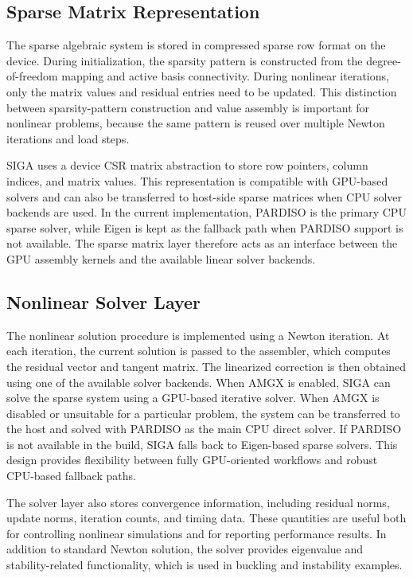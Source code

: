 \documentclass[11pt]{article}
\begin{document}
\subsection{Sparse Matrix Representation}

The sparse algebraic system is stored in compressed sparse row format on the device. During initialization, the sparsity pattern is constructed from the degree-of-freedom mapping and active basis connectivity. During nonlinear iterations, only the matrix values and residual entries need to be updated. This distinction between sparsity-pattern construction and value assembly is important for nonlinear problems, because the same pattern is reused over multiple Newton iterations and load steps.

SIGA uses a device CSR matrix abstraction to store row pointers, column indices, and matrix values. This representation is compatible with GPU-based solvers and can also be transferred to host-side sparse matrices when CPU solver backends are used. In the current implementation, PARDISO is the primary CPU sparse solver, while Eigen is kept as the fallback path when PARDISO support is not available. The sparse matrix layer therefore acts as an interface between the GPU assembly kernels and the available linear solver backends.

\subsection{Nonlinear Solver Layer}

The nonlinear solution procedure is implemented using a Newton iteration. At each iteration, the current solution is passed to the assembler, which computes the residual vector and tangent matrix. The linearized correction is then obtained using one of the available solver backends. When AMGX is enabled, SIGA can solve the sparse system using a GPU-based iterative solver. When AMGX is disabled or unsuitable for a particular problem, the system can be transferred to the host and solved with PARDISO as the main CPU direct solver. If PARDISO is not available in the build, SIGA falls back to Eigen-based sparse solvers. This design provides flexibility between fully GPU-oriented workflows and robust CPU-based fallback paths.

The solver layer also stores convergence information, including residual norms, update norms, iteration counts, and timing data. These quantities are useful both for controlling nonlinear simulations and for reporting performance results. In addition to standard Newton solution, the solver provides eigenvalue and stability-related functionality, which is used in buckling and instability examples.
\end{document}
